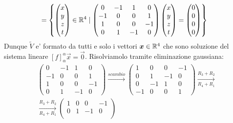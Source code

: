 \begin{solution}
\begin{enumerate}
\begin{alignat*}{1}
            &= \left\{ \begin{pmatrix}x\\y\\z\\t \end{pmatrix}\in \mathbb{R}^4 \mid \begin{pmatrix}
                0 & -1 & 1 & 0 \\ -1 & 0 & 0 & 1 \\
                1 & 0 & 0 & -1 \\ 0 & 1 & -1 & 0
            \end{pmatrix}\begin{pmatrix}x\\y\\z\\t \end{pmatrix} = \begin{pmatrix}0\\0\\0\\0 \end{pmatrix}\right\}
        \end{alignat*}
        Dunque $\widetilde{V}$ e' formato da tutti e solo i vettori $\bm{x} \in \mathbb{R}^4$ che sono soluzione del sistema lineare $[f]^{\alpha}_{\alpha}\vec{x} = \vec{0}$. Risolviamolo tramite eliminazione gaussiana:
        \begin{gather*}
            \begin{pmatrix}
                0  & -1 & 1  & 0  \\ 
                -1 & 0  & 0  & 1  \\
                1  & 0  & 0  & -1 \\ 
                0  & 1  & -1 & 0
            \end{pmatrix} \xrightarrow[]{scambio}
            \begin{pmatrix}
                1  & 0  & 0  & -1 \\
                0  & 1  & -1 & 0  \\
                0  & -1 & 1  & 0  \\ 
                -1 & 0  & 0  & 1
            \end{pmatrix} \xrightarrow[R_4 + R_1]{R_3 + R_2} \\
            \xrightarrow[R_4 + R_1]{R_3 + R_2} \begin{pmatrix}
                1  & 0  & 0  & -1 \\
                0  & 1  & -1 & 0  \\

\end{pmatrix}
\end{gather*}
\end{enumerate}
\end{solution}
